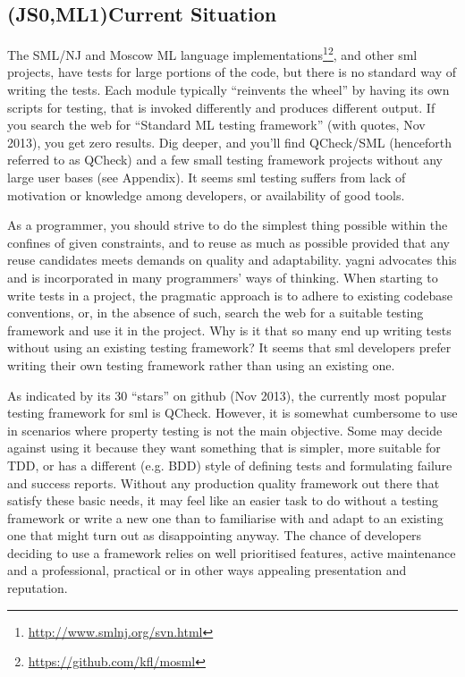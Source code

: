 \documentclass[11pt]{article}
\begin{document}
\subsection{(JS0,ML1)Current Situation}

The SML/NJ and Moscow ML language implementations\footnote{\url{http://www.smlnj.org/svn.html}}\footnote{\url{https://github.com/kfl/mosml}}, and other \gls{sml} projects, have tests for large portions of the code, but there is no standard way of writing the tests. Each module typically ``reinvents the wheel'' by having its own scripts for testing, that is invoked differently and produces different output. If you search the web for ``Standard ML testing framework'' (with quotes, Nov 2013), you get zero results. Dig deeper, and you'll find QCheck/SML (henceforth referred to as QCheck) and a few small testing framework projects without any large user bases (see Appendix). It seems \gls{sml} testing suffers from lack of motivation or knowledge among developers, or availability of good tools. %

As a programmer, you should strive to do the simplest thing possible within the confines of given constraints, and to reuse as much as possible provided that any reuse candidates meets demands on quality and adaptability. \Gls{yagni} advocates this and is incorporated in many programmers' ways of thinking. When starting to write tests in a project, the pragmatic approach is to adhere to existing codebase conventions, or, in the absence of such, search the web for a suitable testing framework and use it in the project. Why is it that so many end up writing tests without using an existing testing framework? It seems that \gls{sml} developers prefer writing their own testing framework rather than using an existing one.

As indicated by its 30 ``stars'' on github (Nov 2013), the currently most popular testing framework for \gls{sml} is QCheck. However, it is somewhat cumbersome to use in scenarios where property testing is not the main objective. Some may decide against using it because they want something that is simpler, more suitable for TDD, or has a different (e.g. BDD) style of defining tests and formulating failure and success reports. Without any production quality framework out there that satisfy these basic needs, it may feel like an easier task to do without a testing framework or write a new one than to familiarise with and adapt to an existing one that might turn out as disappointing anyway. The chance of developers deciding to use a framework relies on well prioritised features, active maintenance and a professional, practical or in other ways appealing presentation and reputation.
\end{document}
